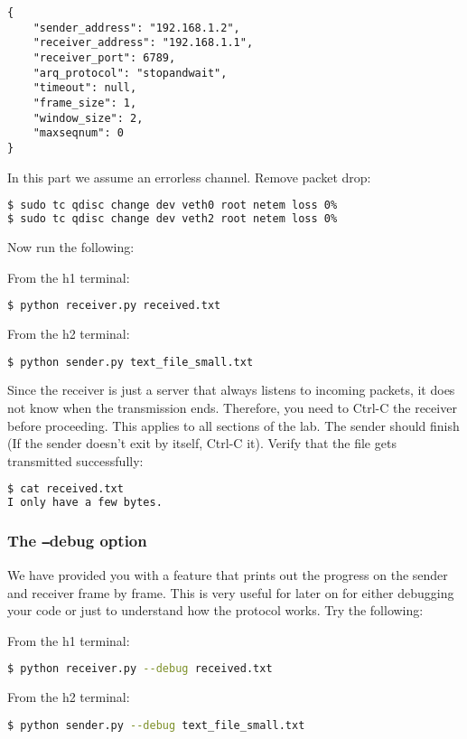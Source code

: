 \documentclass[11pt]{article}
\begin{document}
\begin{minipage}{\linewidth}
\begin{lstlisting}[caption={Configuration For Small File}]
{
    "sender_address": "192.168.1.2",
    "receiver_address": "192.168.1.1",
    "receiver_port": 6789,
    "arq_protocol": "stopandwait",
    "timeout": null,
    "frame_size": 1,
    "window_size": 2,
    "maxseqnum": 0
}
\end{lstlisting}
\end{minipage}

In this part we assume an errorless channel. Remove packet drop:
\begin{lstlisting}[language=bash]
$ sudo tc qdisc change dev veth0 root netem loss 0%
$ sudo tc qdisc change dev veth2 root netem loss 0%
\end{lstlisting}
Now run the following:

From the h1 terminal:
\begin{lstlisting}[language=bash]
$ python receiver.py received.txt
\end{lstlisting}
From the h2 terminal:
\begin{lstlisting}[language=bash]
$ python sender.py text_file_small.txt
\end{lstlisting}
Since the receiver is just a server that always listens to incoming packets, it does not know when the transmission ends. Therefore, you need to Ctrl-C the receiver before proceeding. This applies to all sections of the lab.
The sender should finish (If the sender doesn't exit by itself, Ctrl-C it). Verify that the file gets transmitted successfully:
\begin{lstlisting}[language=bash]
$ cat received.txt
I only have a few bytes.
\end{lstlisting}

\subsubsection {The \texttt{--}debug option}
We have provided you with a feature that prints out the progress on the sender and receiver frame by frame. This is very useful for later on for either debugging your code or just to understand how the protocol works. Try the following:

From the h1 terminal:
\begin{lstlisting}[language=bash]
$ python receiver.py --debug received.txt
\end{lstlisting}
From the h2 terminal:
\begin{lstlisting}[language=bash]
$ python sender.py --debug text_file_small.txt
\end{lstlisting}
\end{document}
